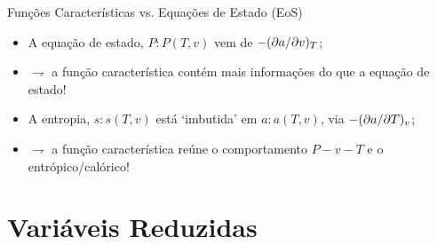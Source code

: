     \begin{frame}{Funções Características vs. Equações de Estado (EoS)}
        \begin{itemize}
            \item<1-> A equação de estado, \alert{$P\!:\!P(T, v)$} vem de \alert{$-(\partial {a}/\partial {v})_{T}$};
                \vspace*\bigskipamount
            \item<2-> $\rightharpoondown$ a \alert{função característica} contém \alert{mais
                informações} do que a \alert{equação de estado}!
                \vspace*\bigskipamount
            \item<3-> A entropia, \alert{$s\!:\!s(T, v)$} está `imbutida' em \alert{$a\!:\!a(T,
                v)$}, via \alert{$-(\partial {a}/\partial {T})_{v}$};
                \vspace*\bigskipamount
            \item<4-> $\rightharpoondown$ a \alert{função característica} reúne o
                \alert{comportamento $P-v-T$} e o \alert{entrópico/calórico}!
        \end{itemize}
    \end{frame}

\section{Variáveis Reduzidas}

